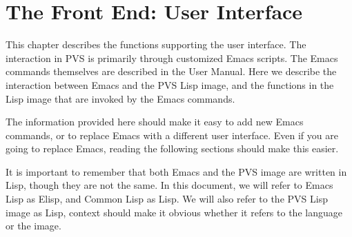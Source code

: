 \documentclass[12pt]{book}
\begin{document}




\chapter{The Front End: User Interface}

This chapter describes the functions supporting the user interface.  The
interaction in PVS is primarily through customized Emacs scripts.  The
Emacs commands themselves are described in the User Manual.  Here we
describe the interaction between Emacs and the PVS Lisp image, and the
functions in the Lisp image that are invoked by the Emacs commands.

The information provided here should make it easy to add new Emacs
commands, or to replace Emacs with a different user interface.  Even if
you are going to replace Emacs, reading the following sections should make
this easier.

It is important to remember that both Emacs and the PVS image are written
in Lisp, though they are not the same.  In this document, we will refer to
Emacs Lisp as Elisp, and Common Lisp as Lisp.  We will also refer to the
PVS Lisp image as Lisp, context should make it obvious whether it refers
to the language or the image.
\end{document}
